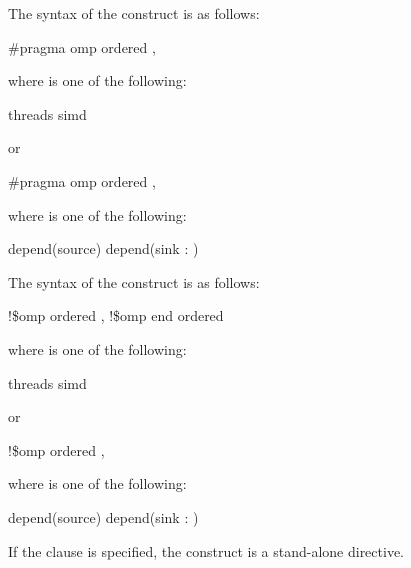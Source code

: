 \begin{samepage}
\syntax
\begin{ccppspecific}
The syntax of the  construct is as follows:

\begin{boxedcode}
\#pragma omp ordered \plc{[clause[ [},\plc{] clause] ]} 
\end{boxedcode}

where  is one of the following:
\begin{indentedcodelist}
threads
simd
\end{indentedcodelist}

or

\begin{boxedcode}
\#pragma omp ordered \plc{clause [[[},\plc{] clause] ... ]} 
\end{boxedcode}
where  is one of the following:
\begin{indentedcodelist}
depend(source)
depend(sink : )
\end{indentedcodelist}


\end{ccppspecific}
\end{samepage}

\begin{fortranspecific}
The syntax of the  construct is as follows:

\begin{boxedcode}
!\$omp ordered \plc{[clause[ [},\plc{] clause] ]}
!\$omp end ordered
\end{boxedcode}

where  is one of the following:
\begin{indentedcodelist}
threads
simd
\end{indentedcodelist}

or

\begin{boxedcode}
!\$omp ordered \plc{clause [[[},\plc{] clause] ... ]}
\end{boxedcode}

where  is one of the following:
\begin{indentedcodelist}
depend(source)
depend(sink : )
\end{indentedcodelist}
\end{fortranspecific}

If the  clause is specified, the  construct is a stand-alone directive.
 
